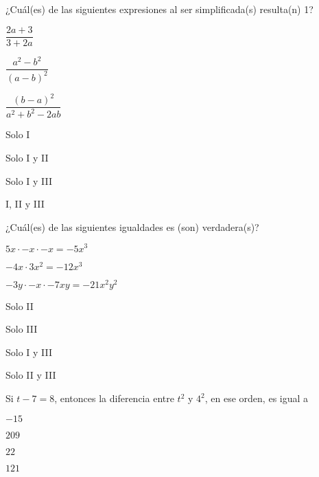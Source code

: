\documentclass{sn-guia}
\begin{document}
\begin{preguntas}

    \pregunta ¿Cuál(es) de las siguientes expresiones al ser simplificada(s) 
    resulta(n) 1?
    \begin{tcenter} 
    \begin{alternativas*}[label=(\Roman*)]
        \item $\dfrac{2a+3}{3+2a}$
        \item $\dfrac{a^2-b^2}{(a-b)^2}$
        \item $\dfrac{(b-a)^2}{a^2+b^2-2ab}$
    \end{alternativas*}
    \end{tcenter}
    \begin{alternativas}[]
        \item Solo I
        \item Solo I y II
        \item Solo I y III
        \item I, II y III
    \end{alternativas}

    \pregunta ¿Cuál(es) de las siguientes igualdades es (son) verdadera(s)?
    \begin{tcenter}
        \begin{alternativas*}[label=(\Roman*)]
            \item $5x \cdot -x \cdot -x = -5x^3$
            \item $-4x \cdot 3x^2 = -12x^3$    
            \item $-3y \cdot -x \cdot -7xy = -21x^2y^2$
        \end{alternativas*}
    \end{tcenter}
    \begin{alternativas}[]
        \item Solo II
        \item Solo III
        \item Solo I y III
        \item Solo II y III
    \end{alternativas}

    \pregunta Si $t-7=8$, entonces la diferencia entre $t^2$ y $4^2$, en ese orden, es igual a
    \begin{alternativas}[]
        \item $-15$
        \item $209$
        \item $22$
        \item $121$
    \end{alternativas}


\end{preguntas}
\end{document}
